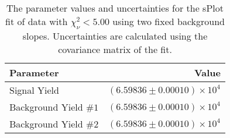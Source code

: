 
\begin{table}[ht]
    \begin{center}
        \begin{tabular}{lr}\toprule
            Parameter & Value \\\midrule
            Signal Yield & $(6.59836 \pm 0.00010) \times 10^{4}$ \\
            Background Yield $\#1$ & $(6.59836 \pm 0.00010) \times 10^{4}$ \\
            Background Yield $\#2$ & $(6.59836 \pm 0.00010) \times 10^{4}$ \\\bottomrule
        \end{tabular}
        \caption{The parameter values and uncertainties for the sPlot fit of data with $\chi^2_\nu < 5.00$ using two fixed background slopes. Uncertainties are calculated using the covariance matrix of the fit.}\label{tab:splot-fit-results-chisqdof-5.00-fixed-2}
    \end{center}
\end{table}
